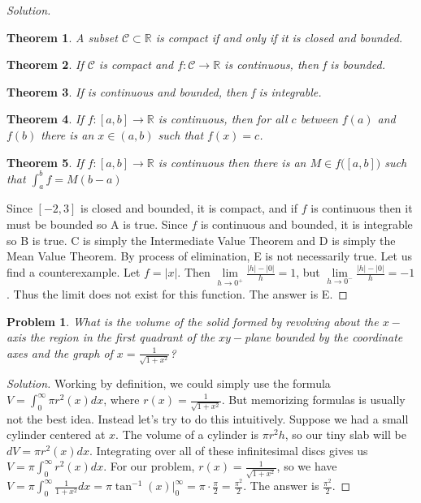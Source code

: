 \documentclass[oneside]{book}
\theoremstyle{mystyle}
\newtheorem{problem}{Problem}[section]
\newtheorem*{theorem*}{Theorem}
\begin{document}
\begin{proof}[Solution]
\begin{theorem*}
A subset $\mathcal{C}\subset \mathbb{R}$ is compact if and only if it is closed and bounded.
\end{theorem*}
\begin{theorem*}
If $\mathcal{C}$ is compact and $f:\mathcal{C}\rightarrow \mathbb{R}$ is continuous, then f is bounded.
\end{theorem*}
\begin{theorem*}
If is continuous and bounded, then f is integrable.
\end{theorem*}
\begin{theorem*}
If $f:[a,b] \rightarrow \mathbb{R}$ is continuous, then for all $c$ between $f(a)$ and $f(b)$ there is an $x\in (a,b)$ such that $f(x) = c$.
\end{theorem*}
\begin{theorem*}
If $f:[a,b]\rightarrow \mathbb{R}$ is continuous then there is an $M\in f\big([a,b]\big)$ such that $\int_{a}^{b}f = M(b-a)$
\end{theorem*}
\noindent Since $[-2,3]$ is closed and bounded, it is compact, and if $f$ is continuous then it must be bounded so A is true. Since $f$ is continuous and bounded, it is integrable so B is true. C is simply the Intermediate Value Theorem and D is simply the Mean Value Theorem. By process of elimination, E is not necessarily true. Let us find a counterexample. Let $f = |x|$. Then $\underset{h\rightarrow 0^+}\lim \frac{|h|-|0|}{h} = 1$, but $\underset{h\rightarrow 0^{-}}\lim \frac{|h|-|0|}{h} = -1$. Thus the limit does not exist for this function. The answer is E.
\end{proof}
\begin{problem}
What is the volume of the solid formed by revolving about the $x-$axis the region in the first quadrant of the $xy-$plane bounded by the coordinate axes and the graph of $x = \frac{1}{\sqrt{1+x^2}}$?
\end{problem}
\begin{proof}[Solution]
Working by definition, we could simply use the formula $V = \int_{0}^{\infty}\pi r^2(x)dx$, where $r(x) = \frac{1}{\sqrt{1+x^2}}$. But memorizing formulas is usually not the best idea. Instead let's try to do this intuitively. Suppose we had a small cylinder centered at $x$. The volume of a cylinder is $\pi r^2 h$, so our tiny slab will be $dV = \pi r^2(x) dx$. Integrating over all of these infinitesimal discs gives us $V = \pi \int_{0}^{\infty}r^2(x)dx$. For our problem, $r(x) = \frac{1}{\sqrt{1+x^2}}$, so we have $V = \pi \int_{0}^{\infty} \frac{1}{1+x^2}dx = \pi \tan^{-1}(x)\big|_{0}^{\infty} = \pi \cdot \frac{\pi}{2} = \frac{\pi^2}{2}$. The answer is $\frac{\pi^2}{2}$.
\end{proof}
\end{document}
